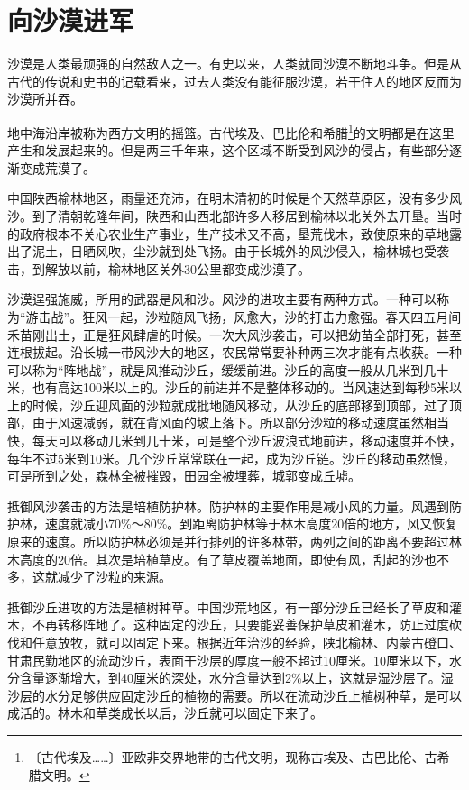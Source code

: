 \documentclass[12pt,UTF-8,openany]{ctexbook}
\begin{document}
\chapter{向沙漠进军}

\begin{large}
    
    沙漠是人类最顽强的自然敌人之一。有史以来，人类就同沙漠不断地斗争。但是从古代的传说和史书的记载看来，过去人类没有能征服沙漠，若干住人的地区反而为沙漠所并吞。
    
    地中海沿岸被称为西方文明的摇篮。古代埃及、巴比伦和希腊\footnote{〔古代埃及……〕亚欧非交界地带的古代文明，现称古埃及、古巴比伦、古希腊文明。}的文明都是在这里产生和发展起来的。但是两三千年来，这个区域不断受到风沙的侵占，有些部分逐渐变成荒漠了。
    
    中国陕西榆林地区，雨量还充沛，在明末清初的时候是个天然草原区，没有多少风沙。到了清朝乾隆年间，陕西和山西北部许多人移居到榆林以北关外去开垦。当时的政府根本不关心农业生产事业，生产技术又不高，垦荒伐木，致使原来的草地露出了泥土，日晒风吹，尘沙就到处飞扬。由于长城外的风沙侵入，榆林城也受袭击，到解放以前，榆林地区关外30公里都变成沙漠了。
    
    沙漠逞强施威，所用的武器是风和沙。风沙的进攻主要有两种方式。一种可以称为“游击战”。狂风一起，沙粒随风飞扬，风愈大，沙的打击力愈强。春天四五月间禾苗刚出土，正是狂风肆虐的时候。一次大风沙袭击，可以把幼苗全部打死，甚至连根拔起。沿长城一带风沙大的地区，农民常常要补种两三次才能有点收获。一种可以称为“阵地战”，就是风推动沙丘，缓缓前进。沙丘的高度一般从几米到几十米，也有高达100米以上的。沙丘的前进并不是整体移动的。当风速达到每秒5米以上的时候，沙丘迎风面的沙粒就成批地随风移动，从沙丘的底部移到顶部，过了顶部，由于风速减弱，就在背风面的坡上落下。所以部分沙粒的移动速度虽然相当快，每天可以移动几米到几十米，可是整个沙丘波浪式地前进，移动速度并不快，每年不过5米到10米。几个沙丘常常联在一起，成为沙丘链。沙丘的移动虽然慢，可是所到之处，森林全被摧毁，田园全被埋葬，城郭变成丘墟。
    
    抵御风沙袭击的方法是培植防护林。防护林的主要作用是减小风的力量。风遇到防护林，速度就减小70\%～80\%。到距离防护林等于林木高度20倍的地方，风又恢复原来的速度。所以防护林必须是并行排列的许多林带，两列之间的距离不要超过林木高度的20倍。其次是培植草皮。有了草皮覆盖地面，即使有风，刮起的沙也不多，这就减少了沙粒的来源。
    
    抵御沙丘进攻的方法是植树种草。中国沙荒地区，有一部分沙丘已经长了草皮和灌木，不再转移阵地了。这种固定的沙丘，只要能妥善保护草皮和灌木，防止过度砍伐和任意放牧，就可以固定下来。根据近年治沙的经验，陕北榆林、内蒙古磴口、甘肃民勤地区的流动沙丘，表面干沙层的厚度一般不超过10厘米。10厘米以下，水分含量逐渐增大，到40厘米的深处，水分含量达到2\%以上，这就是湿沙层了。湿沙层的水分足够供应固定沙丘的植物的需要。所以在流动沙丘上植树种草，是可以成活的。林木和草类成长以后，沙丘就可以固定下来了。
    

\end{large}
\end{document}
